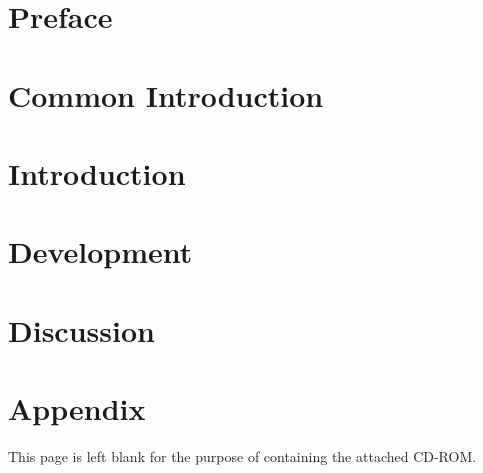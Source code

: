 \thispagestyle{empty}

\cleardoublepage


\chapter*{Preface}


\cleardoublepage
\tableofcontents*


\chapter{Common Introduction}
\label{chap:common_introduction}
%


\chapter{Introduction}

% 
% 




\chapter{Development}







\chapter{Discussion}







\clearpage{\thispagestyle{empty}\cleardoublepage}

\chapter{Appendix}




\label{bib}

\cleardoublepage
\thispagestyle{empty}
\vspace*{4cm}
\label{cd}
{\centering This page is left blank for the purpose of containing the attached CD-ROM.}

\listoffixmes

